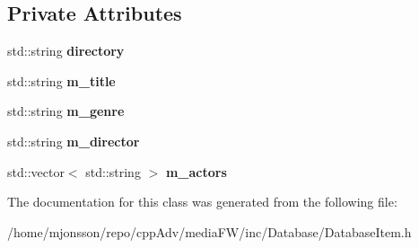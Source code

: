 \subsection*{Private Attributes}
\begin{DoxyCompactItemize}
\item 
\mbox{\label{classDatabaseItem_a5ecbf8e196e110a738bb8ab1fbdff80b}} 
std\+::string {\bfseries directory}
\item 
\mbox{\label{classDatabaseItem_aae3a4413ab461a85af2e79c0491a4e51}} 
std\+::string {\bfseries m\+\_\+title}
\item 
\mbox{\label{classDatabaseItem_a31482f012b886663cd8f2374e5bfe715}} 
std\+::string {\bfseries m\+\_\+genre}
\item 
\mbox{\label{classDatabaseItem_ad83b8f7fe4c6de1a3440ee3397192b01}} 
std\+::string {\bfseries m\+\_\+director}
\item 
\mbox{\label{classDatabaseItem_af98cce4f0865b2bf17d6a484c17ffaf9}} 
std\+::vector$<$ std\+::string $>$ {\bfseries m\+\_\+actors}
\end{DoxyCompactItemize}


The documentation for this class was generated from the following file\+:\begin{DoxyCompactItemize}
\item 
/home/mjonsson/repo/cpp\+Adv/media\+F\+W/inc/\+Database/Database\+Item.\+h\end{DoxyCompactItemize}
